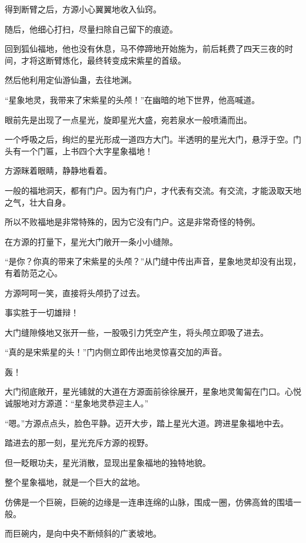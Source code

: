 
\begin{this_body}

得到断臂之后，方源小心翼翼地收入仙窍。

随后，他细心打扫，尽量扫除自己留下的痕迹。

回到狐仙福地，他也没有休息，马不停蹄地开始施为，前后耗费了四天三夜的时间，才将这断臂炼化，最终转变成宋紫星的首级。

然后他利用定仙游仙蛊，去往地渊。

“星象地灵，我带来了宋紫星的头颅！”在幽暗的地下世界，他高喊道。

眼前先是出现了一点星光，旋即星光大盛，宛若泉水一般喷涌而出。

一个呼吸之后，绚烂的星光形成一道四方大门。半透明的星光大门，悬浮于空。门头有一个门匾，上书四个大字星象福地！

方源眯着眼睛，静静地看着。

一般的福地洞天，都有门户。因为有门户，才代表有交流。有交流，才能汲取天地之气，壮大自身。

所以不败福地是非常特殊的，因为它没有门户。这是非常奇怪的特例。

在方源的打量下，星光大门敞开一条小小缝隙。

“是你？你真的带来了宋紫星的头颅？”从门缝中传出声音，星象地灵却没有出现，有着防范之心。

方源呵呵一笑，直接将头颅扔了过去。

事实胜于一切雄辩！

大门缝隙倏地又张开一些，一股吸引力凭空产生，将头颅立即吸了进去。

“真的是宋紫星的头！”门内侧立即传出地灵惊喜交加的声音。

轰！

大门彻底敞开，星光铺就的大道在方源面前徐徐展开，星象地灵匍匐在门口。心悦诚服地对方源道：“星象地灵恭迎主人。”

“嗯。”方源点点头，脸色平静。迈开大步，踏上星光大道。跨进星象福地中去。

踏进去的那一刻，星光充斥方源的视野。

但一眨眼功夫，星光消散，显现出星象福地的独特地貌。

整个星象福地，就是一个巨大的盆地。

仿佛是一个巨碗，巨碗的边缘是一连串连绵的山脉，围成一圈，仿佛高耸的围墙一般。

而巨碗内，是向中央不断倾斜的广袤坡地。


\end{this_body}
